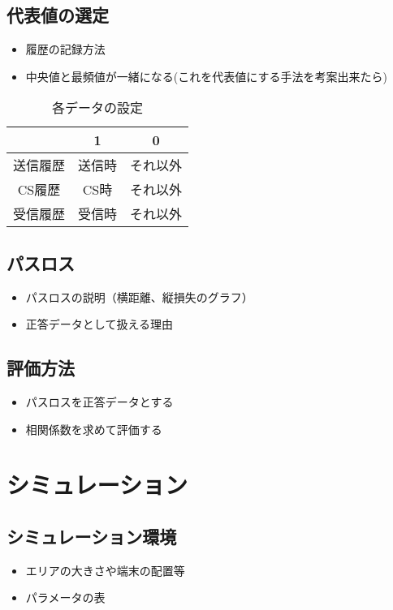 \section{代表値の選定}
\begin{itemize}
  \item 履歴の記録方法
  \item 中央値と最頻値が一緒になる(これを代表値にする手法を考案出来たら)
\end{itemize}

\begin{table}[H]
	\centering
	\caption{各データの設定}
	\begin{tabular}{|c|c|c|}\hline
      & 1 & 0 \\ \hline
    送信履歴 & 送信時 & それ以外 \\ \hline
    CS履歴 & CS時 & それ以外 \\ \hline
    受信履歴 & 受信時 & それ以外 \\ \hline
  \end{tabular}
\end{table}

\section{パスロス}
\begin{itemize}
  \item パスロスの説明（横距離、縦損失のグラフ）
  \item 正答データとして扱える理由
\end{itemize}

\section{評価方法}
\begin{itemize}
  \item パスロスを正答データとする
  \item 相関係数を求めて評価する
\end{itemize}

\chapter{シミュレーション}
\section{シミュレーション環境}
\begin{itemize}
  \item エリアの大きさや端末の配置等
  \item パラメータの表
\end{itemize}

